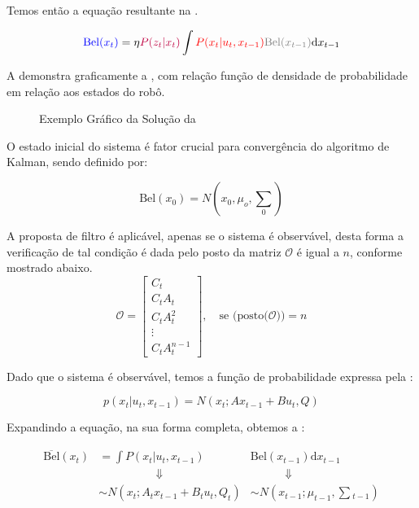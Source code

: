 Temos então a equação resultante na .

\begin{equation}
    \textcolor{blue}{\text{Bel}(x_t)} =\eta \textcolor{purple}{P(z_t|x_t)}\displaystyle\int \textcolor{red}{P(x_t| u_t,x_{t-1})}\textcolor{gray}{\text{Bel}(x_{t-1})}\text{d}x_{t-1}
    \label{eq:kalmbayes}
\end{equation}

A  demonstra graficamente a , com relação função de densidade de probabilidade em relação aos estados do robô.
    
\begin{figure}[!ht]
    \centering
    
    \caption{Exemplo Gráfico da Solução da }
    \label{fig::kalm1}
\end{figure}

O estado inicial do sistema é fator crucial para convergência do algoritmo de Kalman, sendo definido por:

\begin{equation}
    \text{Bel}(x_0) = N\left(x_0, \mu_o, {\textstyle\sum} _0\right)
\end{equation}

A proposta de filtro é aplicável, apenas se o sistema é observável, desta forma a verificação de tal condição é dada pelo posto  da matriz $\mathcal {O}$ é igual a $n$, conforme mostrado abaixo.
\begin{equation*}
    \mathcal {O}={\begin{bmatrix}C_t\\C_tA_t\\C_tA^{2}_t\\\vdots \\C_tA^{n-1}_t\end{bmatrix}, \quad \text{se }(\text{posto}(\mathcal {O}})) = n
\end{equation*}

Dado que o sistema é observável, temos a função de probabilidade expressa pela :

\begin{equation}
    \label{eq:bayes01}
        p(x_t| u_t, x_{t-1})= N\left(x_t; Ax_{t-1}+ Bu_t, Q\right)
\end{equation}   

Expandindo a equação, na sua forma completa, obtemos a :

\begin{equation}   
    \label{eq:bayes02}
    \begin{matrix}
        \overline{\text{Bel}}(x_t)  & = \displaystyle\int P(x_t|u_t, x_{t-1}) & \text{Bel}(x_{t-1})\text{d}x_{t-1} \\
        & \quad\quad\quad\quad\quad \Downarrow & \quad\quad\quad\Downarrow \\
        & \sim N\left(x_t; A_t x_{t-1}+ B_tu_t, Q_t\right) & \sim N\left(x_{t-1}; \mu_{t-1}, \textstyle\sum {}_{t-1}\right) \\
    \end{matrix}
\end{equation}


